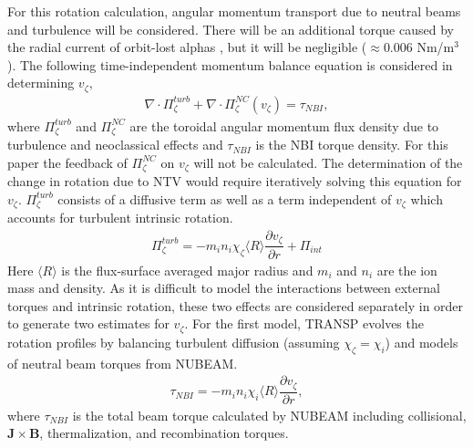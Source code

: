 \documentclass{article}
\newcommand{\partder}[2]{\dfrac{\partial  #1}{\partial  #2}} %
\begin{document}
For this rotation calculation, angular momentum transport due to neutral beams and turbulence will be considered. There will be an additional torque caused by the radial current of orbit-lost alphas \cite{Rosenbluth1996}, but it will be negligible ($\approx 0.006$ Nm/m$^3$). The following time-independent momentum balance equation is considered in determining $v_{\zeta}$,
\begin{gather}
\nabla \cdot \Pi_{\zeta}^{turb} + \nabla \cdot \Pi_{\zeta}^{NC}(v_{\zeta}) = \tau_{NBI},
\end{gather}
where $\Pi^{turb}_{\zeta}$ and $\Pi^{NC}_{\zeta}$ are the toroidal angular momentum flux density due to turbulence and neoclassical effects and $\tau_{NBI}$ is the NBI torque density. For this paper the feedback of $\Pi_{\zeta}^{NC}$ on $v_{\zeta}$ will not be calculated. The determination of the change in rotation due to NTV would require iteratively solving this equation for $v_{\zeta}$. $\Pi_{\zeta}^{turb}$ consists of a diffusive term as well as a term independent of $v_{\zeta}$ which accounts for turbulent intrinsic rotation.
\begin{gather}
\Pi_{\zeta}^{turb} = -m_i n_i \chi_{\zeta} \langle R \rangle\partder{v_{\zeta}}{r} + \Pi_{int}
\end{gather}
Here $\langle R \rangle$ is the flux-surface averaged major radius and $m_i$ and $n_i$ are the ion mass and density. As it is difficult to model the interactions between external torques and intrinsic rotation, these two effects are considered separately in order to generate two estimates for $v_{\zeta}$. For the first model, TRANSP evolves the rotation profiles by balancing turbulent diffusion (assuming $\chi_{\zeta} = \chi_{i}$) and models of neutral beam torques from NUBEAM. 
\begin{gather}
\tau_{NBI} = -m_i n_i \chi_{i} \langle R \rangle \partder{v_{\zeta}}{r},
\end{gather}
where $\tau_{NBI}$ is the total beam torque calculated by NUBEAM including collisional, $\bm{J} \times \bm{B}$, thermalization, and recombination torques.
\end{document}
